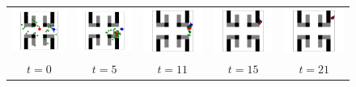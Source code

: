 \documentclass[letterpaper]{article} %
\begin{document}
\begin{figure}[!htb]
	\centering
	\begin{tabular}{ccccc}
		\includegraphics[width=0.18\linewidth]{figs/153/0.pdf} &
		\includegraphics[width=0.18\linewidth]{figs/153/5.pdf} &
		\includegraphics[width=0.18\linewidth]{figs/153/11.pdf} &
		\includegraphics[width=0.18\linewidth]{figs/153/15.pdf} &
		\includegraphics[width=0.18\linewidth]{figs/153/21.pdf} \\
		$t=0$ & $t=5$ & $t=11$ & $t=15$ & $t=21$
	\end{tabular}
\end{figure}
\end{document}
